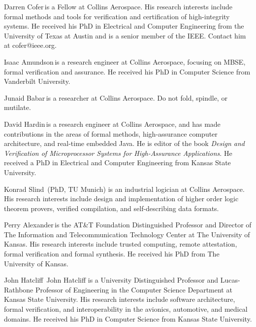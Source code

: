 \begin{IEEEbiography}{Darren Cofer}{\,}is a Fellow at Collins Aerospace. His research interests include formal methods and tools for verification and certification of high-integrity systems. He received his PhD in Electrical and Computer Engineering from the University of Texas at Austin and is a senior member of the IEEE. Contact him at cofer@ieee.org.
\end{IEEEbiography}

\begin{IEEEbiography}{Isaac Amundson}{\,}is a research engineer at Collins Aerospace, focusing on MBSE, formal verification and assurance.  He received his PhD in Computer Science from Vanderbilt University.
\end{IEEEbiography}

\begin{IEEEbiography}{Junaid Babar}{\,}is a researcher at Collins Aerospace.
Do not fold, spindle, or mutilate.  
\end{IEEEbiography}

\begin{IEEEbiography}{David Hardin}{\,}is a research engineer
  at Collins Aerospace, and has made contributions in
  the areas of formal methods, high-assurance computer architecture,
  and real-time embedded Java.  He is editor of the book \emph{Design
    and Verification of Microprocessor Systems for High-Assurance
    Applications}.  He received a PhD in Electrical and Computer
  Engineering from Kansas State University.
\end{IEEEbiography}

\begin{IEEEbiography}{Konrad Slind}{\,} (PhD, TU Munich) is an industrial logician at Collins Aerospace.
  His research interests include design and implementation of higher
  order logic theorem provers, verified compilation, and
  self-describing data formats.
\end{IEEEbiography}

\begin{IEEEbiography}{Perry Alexander}{\,}is the AT\&T Foundation
  Distinguished Professor and Director of The Information and
  Telecommunication Technology Center at The University of Kansas.
  His research interests include trusted computing, remote
  attestation, formal verification and formal synthesis. He received
  his PhD from The University of Kansas.
\end{IEEEbiography}

\begin{IEEEbiography}{John Hatcliff}{\,}
John Hatcliff is a University Distinguished Professor and
Lucas-Rathbone Professor of Engineering in the Computer Science
Department at Kansas State University.  His research interests include
software architecture, formal verification, and interoperability in 
the avionics, automotive, and medical domains.
He received his PhD in Computer Science from Kansas State University.
\end{IEEEbiography}

